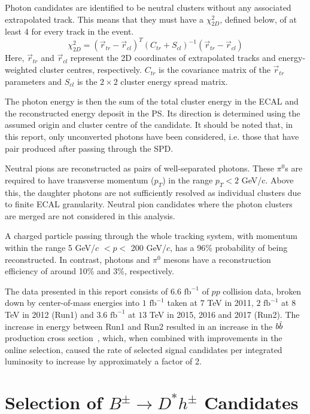 \documentclass[oneside,12pt]{article}
\newcommand{\overbar}[1]{\mkern 1.5mu\overline{\mkern-1.5mu#1\mkern-1.5mu}\mkern
1.5mu}
\begin{document}
Photon candidates are identified to be neutral clusters without any associated
extrapolated track. This means that they must have a $\chi^2_{2D}$, defined
below, of at least 4 for every track in the event.
\begin{equation}
  \chi^2_{2D}=(\vec{r}_{tr}-\vec{r}_{cl})^T(C_{tr}+S_{cl})^{-1}(\vec{r}_{tr}-\vec{r}_{cl})
  \label{Chi2}
\end{equation}
\noindent Here, $\vec{r}_{tr}$ and $\vec{r}_{cl}$ represent the 2D coordinates
of extrapolated tracks and energy-weighted cluster centres, respectively.
$C_{tr}$ is the covariance matrix of the $\vec{r}_{tr}$ parameters and $S_{cl}$
is the $2 \times 2$ cluster energy spread matrix.  

The photon energy is then the sum of the total cluster energy in the ECAL and
the reconstructed energy deposit in the PS. Its direction is determined using
the assumed origin and cluster centre of the candidate. It should be noted that,
in this report, only unconverted photons have been considered, i.e. those that
have pair produced after passing through the SPD.

Neutral pions are reconstructed as pairs of well-separated photons. These
$\pi^0$s are required to have transverse momentum ($p_T$) in the range $p_{T}<2$
GeV/c.  Above this, the daughter photons are not sufficiently resolved as
individual clusters due to finite ECAL granularity. Neutral pion candidates
where the photon clusters are merged are not considered in this analysis.

A charged particle passing through the whole tracking system, with momentum
within the range 5 GeV/$c$ $< p <$ 200 GeV/$c$, has a 96\% probability of being
reconstructed. In contrast, photons and $\pi^0$ mesons have a reconstruction
efficiency of around 10\% and 3\%, respectively.

The data presented in this report consists of $6.6$ $\text{fb}^{-1}$ of $pp$
collision data, broken down by center-of-mass energies into $1$ $\text{fb}^{-1}$ taken at $7$ TeV in 2011, $2$
$\text{fb}^{-1}$ at $8$ TeV in 2012 (Run1) and $3.6$ $\text{fb}^{-1}$ at $13$
TeV in 2015, 2016 and 2017 (Run2). The increase in energy between Run1 and Run2
resulted in an increase in the $b\overbar{b}$ production cross
section~\cite{PDG2018}, which, when combined with improvements in the online
selection, caused the rate of selected signal candidates per integrated
luminosity to increase by approximately a factor of 2.

\section{Selection of $B^{\pm}\rightarrow D^*h^{\pm}$ Candidates} \label{sec:selections}
\end{document}
